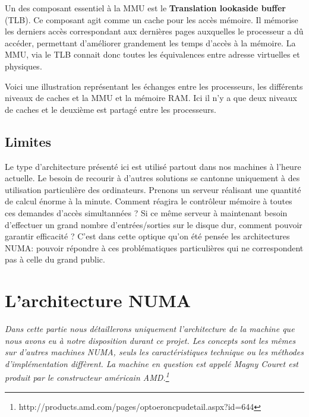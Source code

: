       Un des composant essentiel à la MMU est le \textbf{Translation lookaside
        buffer} (TLB). Ce composant agit comme un cache pour les accès
      mémoire. Il mémorise les derniers accès correspondant aux dernières pages
      auxquelles le processeur a dû accéder, permettant d'améliorer grandement
      les temps d'accès à la mémoire. La MMU, via le TLB connait donc toutes les
      équivalences entre adresse virtuelles et physiques.


      Voici une illustration représentant les échanges entre les processeurs,
      les différents niveaux de caches et la MMU et la mémoire RAM. Ici il n'y a
      que deux niveaux de caches et le deuxième est partagé entre les
      processeurs.
    


    \subsection{Limites}
  
      Le type d'architecture présenté ici est utilisé partout dans nos machines
      à l'heure actuelle. Le besoin de recourir à d'autres solutions se cantonne
      uniquement à des utilisation particulière des ordinateurs. Prenons un
      serveur réalisant une quantité de calcul énorme à la minute. Comment
      réagira le contrôleur mémoire à toutes ces demandes d'accès simultannées ?
      Si ce même serveur à maintenant besoin d'effectuer un grand nombre
      d'entrées/sorties sur le disque dur, comment pouvoir garantir efficacité ?
      C'est dans cette optique qu'on été pensée les architectures NUMA: pouvoir
      répondre à ces problématiques particulières qui ne correspondent pas à
      celle du grand public.

\newpage

  \section{L'architecture NUMA}
    
    \textit{Dans cette partie nous détaillerons uniquement l'architecture de la
      machine que nous avons eu à notre disposition durant ce projet. Les
      concepts sont les mêmes sur d'autres machines NUMA, seuls les
      caractéristiques technique ou les méthodes d'implémentation diffèrent. La
      machine en question est appelé \og Magny Cour\fg et est produit par le
      constructeur américain
      AMD.\footnote{http://products.amd.com/pages/optoeroncpudetail.aspx?id=644}\newline}


